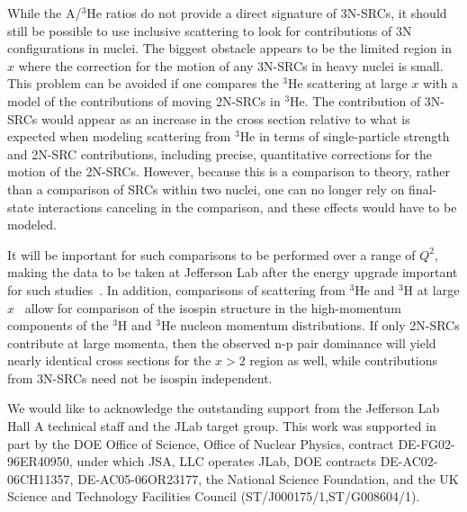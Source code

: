 \documentclass[aps,prl,superscriptaddress,showpacs,twocolumn,floatfix,amsmath,amssymb]{revtex4-1}
\begin{document}
While the A/$^3$He ratios do not provide a direct signature of 3N-SRCs, it should still be possible to use
inclusive scattering to look for contributions of 3N configurations in nuclei. The biggest obstacle appears
to be the limited region in $x$ where the correction for the motion of any 3N-SRCs in heavy nuclei is small.
This problem can be avoided if one compares the $^3$He scattering at large $x$ with a model of the
contributions of moving 2N-SRCs in $^3$He. The contribution of 3N-SRCs would appear as an increase in the
cross section relative to what is expected when modeling scattering from $^3$He in terms of single-particle
strength and 2N-SRC contributions, including precise, quantitative corrections for the motion of the
2N-SRCs. However, because this is a comparison to theory, rather than a comparison of SRCs within two
nuclei, one can no longer rely on final-state interactions canceling in the comparison, and these effects
would have to be modeled.

It will be important for such comparisons to be performed over a range of $Q^2$, making the data to be taken
at Jefferson Lab after the energy upgrade important for such studies~\cite{e1206105}. In addition,
comparisons of scattering from $^3$He and $^3$H at large $x$~\cite{e1211112} allow for comparison of the
isospin structure in the high-momentum components of the $^3$H and $^3$He nucleon momentum distributions. If
only 2N-SRCs contribute at large momenta, then the observed n-p pair dominance will yield nearly identical
cross sections for the $x>2$ region as well, while contributions from 3N-SRCs need not be isospin independent.

\begin{acknowledgments}

We would like to acknowledge the outstanding support from the Jefferson Lab Hall A technical staff and the
JLab target group. This work was supported in part by the DOE Office of Science, Office of Nuclear Physics,
contract DE-FG02-96ER40950, under which JSA, LLC operates JLab, DOE contracts DE-AC02-06CH11357,
DE-AC05-06OR23177, the National Science Foundation, and the UK Science and Technology Facilities Council
(ST/J000175/1,ST/G008604/1).

\end{acknowledgments}

%


\end{document}
